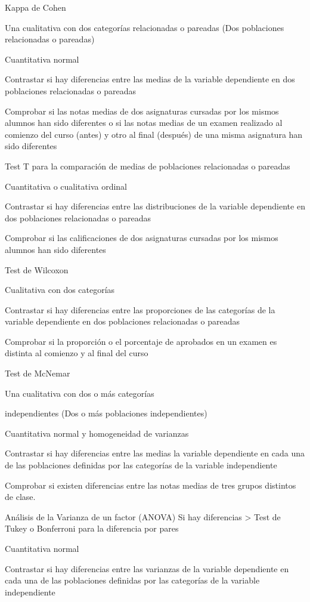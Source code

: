 \documentclass[
  spanish,
  a4paper,
]{scrreport}
\theoremstyle{definition}
\theoremstyle{definition}
\theoremstyle{remark}
\begin{document}
Kappa de Cohen

Una cualitativa con dos categorías relacionadas o pareadas (Dos
poblaciones relacionadas o pareadas)

Cuantitativa normal

Contrastar si hay diferencias entre las medias de la variable
dependiente en dos poblaciones relacionadas o pareadas

Comprobar si las notas medias de dos asignaturas cursadas por los mismos
alumnos han sido diferentes o si las notas medias de un examen realizado
al comienzo del curso (antes) y otro al final (después) de una misma
asignatura han sido diferentes

Test T para la comparación de medias de poblaciones relacionadas o
pareadas

Cuantitativa o cualitativa ordinal

Contrastar si hay diferencias entre las distribuciones de la variable
dependiente en dos poblaciones relacionadas o pareadas

Comprobar si las calificaciones de dos asignaturas cursadas por los
mismos alumnos han sido diferentes

Test de Wilcoxon

Cualitativa con dos categorías

Contrastar si hay diferencias entre las proporciones de las categorías
de la variable dependiente en dos poblaciones relacionadas o pareadas

Comprobar si la proporción o el porcentaje de aprobados en un examen es
distinta al comienzo y al final del curso

Test de McNemar

Una cualitativa con dos o más categorías

independientes (Dos o más poblaciones independientes)

Cuantitativa normal y homogeneidad de varianzas

Contrastar si hay diferencias entre las medias la variable dependiente
en cada una de las poblaciones definidas por las categorías de la
variable independiente

Comprobar si existen diferencias entre las notas medias de tres grupos
distintos de clase.

Análisis de la Varianza de un factor (ANOVA) Si hay diferencias
\textgreater{} Test de Tukey o Bonferroni para la diferencia por pares

Cuantitativa normal

Contrastar si hay diferencias entre las varianzas de la variable
dependiente en cada una de las poblaciones definidas por las categorías
de la variable independiente
\end{document}
